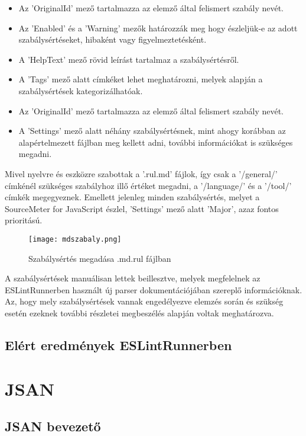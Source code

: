 \begin{itemize}
    \item Az 'OriginalId' mező tartalmazza az elemző által felismert szabály nevét.
    \item Az 'Enabled' és a 'Warning' mezők határozzák meg hogy észleljük-e az adott szabálysértéseket, hibaként vagy figyelmeztetésként.
    \item A 'HelpText' mező rövid leírást tartalmaz a szabálysértésről. 
    \item A 'Tags' mező alatt címkéket lehet meghatározni, melyek alapján a szabálysértések kategorizálhatóak.
    \item Az 'OriginalId' mező tartalmazza az elemző által felismert szabály nevét.
    \item A 'Settings' mező alatt néhány szabálysértésnek, mint ahogy korábban az alapértelmezett fájlban meg kellett adni, további információkat is szükséges megadni.
\end{itemize}
 Mivel nyelvre és eszközre szabottak a '.rul.md' fájlok, így csak a '/general/' címkénél szükséges szabályhoz illő értéket megadni, a '/language/' és a '/tool/' címkék megegyeznek. Emellett jelenleg minden szabálysértés, melyet a SourceMeter for JavaScript észlel, 'Settings' mező alatt 'Major', azaz fontos prioritású.

\begin{figure}[!htbp]
    \caption{Szabálysértés megadása .md.rul fájlban}\label{fig:mdszabaly}
    \centering
    \texttt{[image: mdszabaly.png]}
\end{figure}

A szabálysértések manuálisan lettek beillesztve, melyek megfelelnek az ESLintRunnerben használt új parser dokumentációjában szereplő információknak. Az, hogy mely szabálysértések vannak engedélyezve elemzés során és szükség esetén ezeknek további részletei megbeszélés alapján voltak meghatározva.

\subsection{Elért eredmények ESLintRunnerben}

\section{JSAN}

\subsection{JSAN bevezető}

